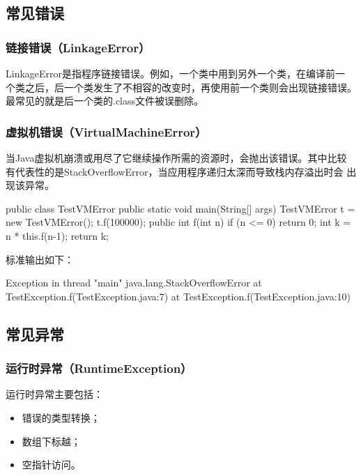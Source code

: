 \subsection{常见错误}

\subsubsection{链接错误（LinkageError）}

LinkageError是指程序链接错误。例如，一个类中用到另外一个类，在编译前一
个类之后，后一个类发生了不相容的改变时，再使用前一个类则会出现链接错误。
最常见的就是后一个类的.class文件被误删除。

\subsubsection{虚拟机错误（VirtualMachineError）}
 
当Java虚拟机崩溃或用尽了它继续操作所需的资源时，会抛出该错误。其中比较
有代表性的是StackOverflowError，当应用程序递归太深而导致栈内存溢出时会
出现该异常。


\begin{javaCode}
  public class TestVMError {
    public static void main(String[] args) {
      TestVMError t = new TestVMError();
      t.f(100000);
    }
    public int f(int n) {
      if (n <= 0) {
        return 0;
      }
      int k = n * this.f(n-1);
      return k;
    }
  }
\end{javaCode}

标准输出如下：

\begin{stdoutCode}
  Exception in thread "main" java.lang.StackOverflowError
  at TestException.f(TestException.java:7)
  at TestException.f(TestException.java:10)  
\end{stdoutCode}

\subsection{常见异常}

\subsubsection{运行时异常（RuntimeException）}

运行时异常主要包括：

\begin{itemize}
\item 错误的类型转换；
\item 数组下标越；
\item 空指针访问。
\end{itemize}

